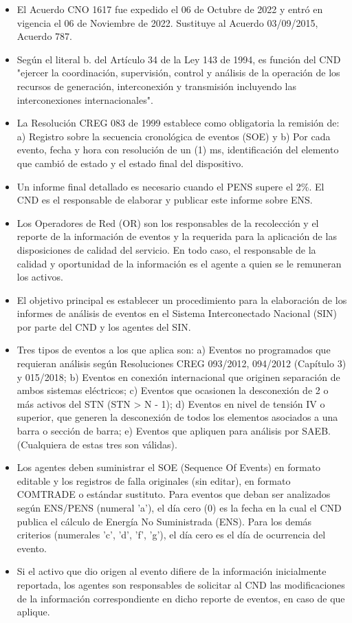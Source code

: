 \documentclass[a5paper]{book}%
\begin{document}
  \begin{itemize}

  \item El Acuerdo CNO 1617 fue expedido el 06 de Octubre de 2022 y entró en vigencia el 06 de Noviembre de 2022. Sustituye al Acuerdo 03/09/2015, Acuerdo 787.
  \item Según el literal b. del Artículo 34 de la Ley 143 de 1994, es función del CND "ejercer la coordinación, supervisión, control y análisis de la operación de los recursos de generación, interconexión y transmisión incluyendo las interconexiones internacionales".
  \item La Resolución CREG 083 de 1999 establece como obligatoria la remisión de: a) Registro sobre la secuencia cronológica de eventos (SOE) y b) Por cada evento, fecha y hora con resolución de un (1) ms, identificación del elemento que cambió de estado y el estado final del dispositivo.
  \item Un informe final detallado es necesario cuando el PENS supere el 2\%. El CND es el responsable de elaborar y publicar este informe sobre ENS.
  \item Los Operadores de Red (OR) son los responsables de la recolección y el reporte de la información de eventos y la requerida para la aplicación de las disposiciones de calidad del servicio. En todo caso, el responsable de la calidad y oportunidad de la información es el agente a quien se le remuneran los activos.
  \item El objetivo principal es establecer un procedimiento para la elaboración de los informes de análisis de eventos en el Sistema Interconectado Nacional (SIN) por parte del CND y los agentes del SIN.
  \item Tres tipos de eventos a los que aplica son: a) Eventos no programados que requieran análisis según Resoluciones CREG 093/2012, 094/2012 (Capítulo 3) y 015/2018; b) Eventos en conexión internacional que originen separación de ambos sistemas eléctricos; c) Eventos que ocasionen la desconexión de 2 o más activos del STN (STN > N - 1); d) Eventos en nivel de tensión IV o superior, que generen la desconexión de todos los elementos asociados a una barra o sección de barra; e) Eventos que apliquen para análisis por SAEB. (Cualquiera de estas tres son válidas).
  \item Los agentes deben suministrar el SOE (Sequence Of Events) en formato editable y los registros de falla originales (sin editar), en formato COMTRADE o estándar sustituto.
    Para eventos que deban ser analizados según ENS/PENS (numeral 'a'), el día cero (0) es la fecha en la cual el CND publica el cálculo de Energía No Suministrada (ENS). Para los demás criterios (numerales 'c', 'd', 'f', 'g'), el día cero es el día de ocurrencia del evento.
  \item Si el activo que dio origen al evento difiere de la información inicialmente reportada, los agentes son responsables de solicitar al CND las modificaciones de la información correspondiente en dicho reporte de eventos, en caso de que aplique.
    \end{itemize}
\end{document}
